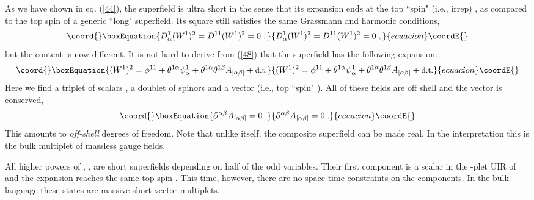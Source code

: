 \documentclass[a4paper,12pt]{article}
\begin{document}
As we have shown in eq. (\ref{44}), the superfield \coordHE{} is ultra 
short in the sense that its expansion ends at the top ``spin" 
(i.e., \coordHE{} irrep) \coordHE{}, as compared to the top spin 
\coordHE{} of a generic \coordHE{} ``long" superfield. Its square 
\coordHE{} still satisfies the same Grassmann and harmonic 
conditions, 
\begin{equation}\coord{}\boxEquation{\label{48}
  D^1_\alpha (W^1)^2 = D^{11} (W^1)^2 =0\;,
}{D^1_\alpha (W^1)^2 = D^{11} (W^1)^2 =0\;,
}{ecuacion}\coordE{}\end{equation}
but the content is now different. It is not hard to derive from 
(\ref{48}) that the superfield \coordHE{} has the following 
expansion: 
\begin{equation}\coord{}\boxEquation{\label{49}
  (W^1)^2 = \phi^{11} + \theta^{1\alpha}\psi^1_\alpha + 
\theta^{1\alpha}\theta^{1\beta} A_{[\alpha\beta]} + \mbox{\small 
d.t.} 
}{(W^1)^2 = \phi^{11} + \theta^{1\alpha}\psi^1_\alpha + 
\theta^{1\alpha}\theta^{1\beta} A_{[\alpha\beta]} + \mbox{\small 
d.t.} 
}{ecuacion}\coordE{}\end{equation}
Here we find a triplet of scalars  
\coordHE{}, a doublet of spinors 
\coordHE{} and a vector (i.e., top 
``spin" \coordHE{}). All of these fields are off shell and the 
vector is conserved, 
\begin{equation}\coord{}\boxEquation{\label{50}
  \partial^{\alpha\beta} A_{[\alpha\beta]} = 0\;.
}{\partial^{\alpha\beta} A_{[\alpha\beta]} = 0\;.
}{ecuacion}\coordE{}\end{equation}
This amounts to \coordHE{} {\it off-shell} degrees of freedom. Note 
that unlike \coordHE{} itself, the composite superfield 
\coordHE{} can be made real. In the \coordHE{} interpretation this is the bulk
multiplet of massless gauge fields.

All higher powers of \coordHE{}, \coordHE{}, \coordHE{} are short 
superfields depending on half of the odd variables. Their first 
component is a scalar in the \coordHE{}-plet UIR of \coordHE{} and the expansion reaches the same top spin \coordHE{}. This 
time, however, there are no space-time constraints on the 
components. In the bulk language these states are massive short vector multiplets.
\end{document}
